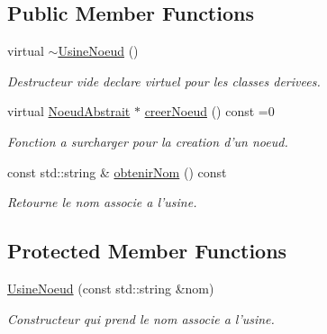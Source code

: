 \subsection*{Public Member Functions}
\begin{DoxyCompactItemize}
\item 
\hypertarget{class_usine_noeud_a1599bf38e75c61c68af55fc4d1e1059c}{virtual \hyperlink{class_usine_noeud_a1599bf38e75c61c68af55fc4d1e1059c}{$\sim$\-Usine\-Noeud} ()}\label{class_usine_noeud_a1599bf38e75c61c68af55fc4d1e1059c}

\begin{DoxyCompactList}\small\item\em Destructeur vide declare virtuel pour les classes derivees. \end{DoxyCompactList}\item 
\hypertarget{class_usine_noeud_a47c1970af3739268f5e4a35cb451d528}{virtual \hyperlink{class_noeud_abstrait}{Noeud\-Abstrait} $\ast$ \hyperlink{class_usine_noeud_a47c1970af3739268f5e4a35cb451d528}{creer\-Noeud} () const =0}\label{class_usine_noeud_a47c1970af3739268f5e4a35cb451d528}

\begin{DoxyCompactList}\small\item\em Fonction a surcharger pour la creation d'un noeud. \end{DoxyCompactList}\item 
const std\-::string \& \hyperlink{group__inf2990_ga78cfb214df5805c43d4ca4b71411d060}{obtenir\-Nom} () const 
\begin{DoxyCompactList}\small\item\em Retourne le nom associe a l'usine. \end{DoxyCompactList}\end{DoxyCompactItemize}
\subsection*{Protected Member Functions}
\begin{DoxyCompactItemize}
\item 
\hypertarget{class_usine_noeud_ad596eb4296099f9e9afa55988577606e}{\hyperlink{class_usine_noeud_ad596eb4296099f9e9afa55988577606e}{Usine\-Noeud} (const std\-::string \&nom)}\label{class_usine_noeud_ad596eb4296099f9e9afa55988577606e}

\begin{DoxyCompactList}\small\item\em Constructeur qui prend le nom associe a l'usine. \end{DoxyCompactList}\end{DoxyCompactItemize}


